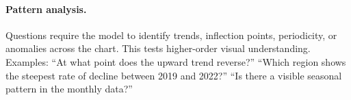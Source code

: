 \paragraph{Pattern analysis.}
Questions require the model to identify trends, inflection points, periodicity, or anomalies across the chart. This tests higher-order visual understanding. Examples: ``At what point does the upward trend reverse?'' ``Which region shows the steepest rate of decline between 2019 and 2022?'' ``Is there a visible seasonal pattern in the monthly data?''
